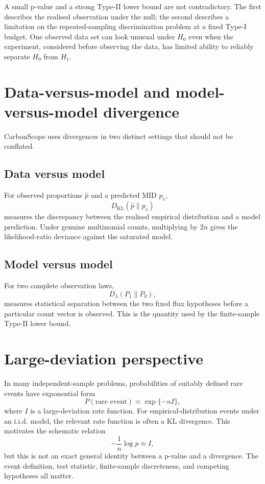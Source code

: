 \documentclass[11pt]{article}
\newcommand{\KL}{D_{\mathrm{KL}}}
\begin{document}
A small p-value and a strong Type-II lower bound are not contradictory. The
first describes the realised observation under the null; the second describes
a limitation on the repeated-sampling discrimination problem at a fixed
Type-I budget. One observed data set can look unusual under $H_0$ even when the
experiment, considered before observing the data, has limited ability to
reliably separate $H_0$ from $H_1$.

\section{Data-versus-model and model-versus-model divergence}

CarbonScope uses divergences in two distinct settings that should not be conflated.

\subsection*{Data versus model}
For observed proportions $\widehat p$ and a predicted MID $p_v$,
\begin{equation}
\KL(\widehat p\|p_v)
\end{equation}
measures the discrepancy between the realised empirical distribution and a
model prediction. Under genuine multinomial counts, multiplying by $2n$ gives
the likelihood-ratio deviance against the saturated model.

\subsection*{Model versus model}
For two complete observation laws,
\begin{equation}
D_\lambda(P_1\|P_0),
\end{equation}
measures statistical separation between the two fixed flux hypotheses before a
particular count vector is observed. This is the quantity used by the
finite-sample Type-II lower bound.

\section{Large-deviation perspective}

In many independent-sample problems, probabilities of suitably defined rare
events have exponential form
\begin{equation}
P(\text{rare event})\asymp \exp\{-nI\},
\end{equation}
where $I$ is a large-deviation rate function. For empirical-distribution events
under an i.i.d. model, the relevant rate function is often a KL divergence.
This motivates the schematic relation
\begin{equation}
-\frac{1}{n}\log p \approx I,
\end{equation}
but this is not an exact general identity between a p-value and a divergence.
The event definition, test statistic, finite-sample discreteness, and competing
hypotheses all matter.
\end{document}
